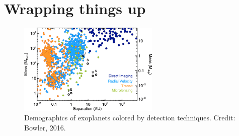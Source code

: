 \documentclass[11pt]{article}
\begin{document}

\section{Wrapping things up}

\begin{figure}[h!]
    \centering
    \includegraphics[width=0.6\textwidth]{Images/Exoplanet Demographic Techniques.png}
    \caption{Demographics of exoplanets colored by detection techniques. Credit: Bowler, 2016.}
    \label{fig:techniques}
\end{figure}
\end{document}
